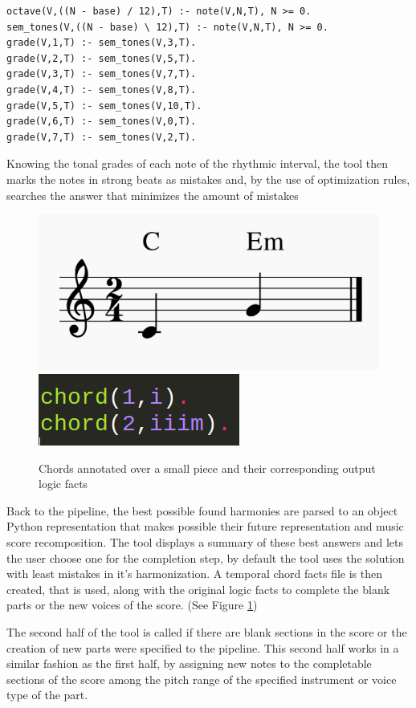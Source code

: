\begin{Verbatim}[frame=single]
octave(V,((N - base) / 12),T) :- note(V,N,T), N >= 0.
sem_tones(V,((N - base) \ 12),T) :- note(V,N,T), N >= 0.
grade(V,1,T) :- sem_tones(V,3,T).
grade(V,2,T) :- sem_tones(V,5,T).
grade(V,3,T) :- sem_tones(V,7,T).
grade(V,4,T) :- sem_tones(V,8,T).
grade(V,5,T) :- sem_tones(V,10,T).
grade(V,6,T) :- sem_tones(V,0,T).
grade(V,7,T) :- sem_tones(V,2,T).
\end{Verbatim}

Knowing the tonal grades of each note of the rhythmic interval, the tool then marks the notes in strong beats as mistakes and, by the use of optimization rules, searches the answer that minimizes the amount of mistakes


\begin{figure}[h]
	\centering
	\includegraphics[width=0.4\linewidth,valign=c]{imagenes/harmonized_example.png}
	\includegraphics[width=0.2\linewidth,valign=c]{imagenes/chord_facts.png}
	\caption{Chords annotated over a small piece and their corresponding output logic facts}
	\label{fig:simple-piece-chords}
\end{figure}

Back to the pipeline, the best possible found harmonies are parsed to an object Python representation that makes possible their future representation and music score recomposition. The tool displays a summary of these best answers and lets the user choose one for the completion step, by default the tool uses the solution with least mistakes in it's harmonization. A temporal chord facts file is then created, that is used, along with the original logic facts to complete the blank parts or the new voices of the score. (See Figure \ref{fig:simple-piece-chords})

The second half of the tool is called if there are blank sections in the score or the creation of new parts were specified to the pipeline. This second half works in a similar fashion as the first half, by assigning new notes to the completable sections of the score among the pitch range of the specified instrument or voice type of the part.

